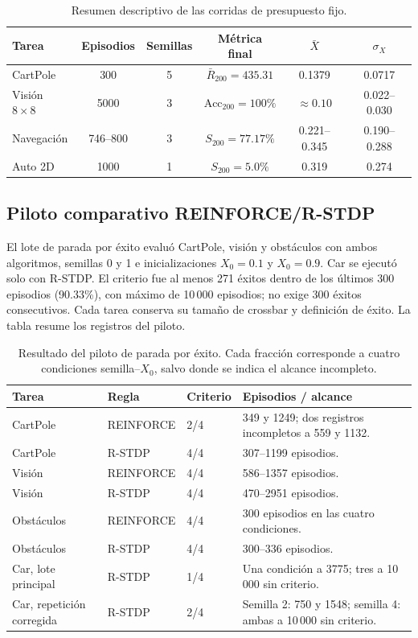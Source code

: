 \begin{table}[H]
\centering
\small
\caption{Resumen descriptivo de las corridas de presupuesto fijo.}
\label{tab:cross_task}
\begin{tabular}{lccccc}
\toprule
Tarea & Episodios & Semillas & M\'etrica final & $\bar X$ & $\sigma_X$\\
\midrule
CartPole & 300 & 5 & $\bar R_{200}=435.31$ & 0.1379 & 0.0717\\
Visi\'on $8\times8$ & 5000 & 3 & $\mathrm{Acc}_{200}=100\%$ & $\approx0.10$ & 0.022--0.030\\
Navegaci\'on & 746--800 & 3 & $S_{200}=77.17\%$ & 0.221--0.345 & 0.190--0.288\\
Auto 2D & 1000 & 1 & $S_{200}=5.0\%$ & 0.319 & 0.274\\
\bottomrule
\end{tabular}
\end{table}

\subsection{Piloto comparativo REINFORCE/R-STDP}
\label{sec:piloto_rstdp_reinforce}

El lote de parada por \'exito evalu\'o CartPole, visi\'on y obst\'aculos con ambos
algoritmos, semillas 0 y 1 e inicializaciones $X_0=0.1$ y $X_0=0.9$.
Car se ejecut\'o solo con R-STDP. El criterio fue al menos 271 \'exitos dentro
de los \'ultimos 300 episodios (90.33\%), con m\'aximo de 10\,000 episodios;
no exige 300 \'exitos consecutivos. Cada tarea conserva su tama\~no de crossbar
y definici\'on de \'exito. La tabla resume los registros del piloto.

\begin{table}[H]
\centering
\footnotesize
\begin{tabularx}{\textwidth}{l l p{1.5cm} X}
\toprule
Tarea & Regla & Criterio & Episodios / alcance\\
\midrule
CartPole & REINFORCE & 2/4 & 349 y 1249; dos registros incompletos a 559 y 1132.\\
CartPole & R-STDP & 4/4 & 307--1199 episodios.\\
Visi\'on & REINFORCE & 4/4 & 586--1357 episodios.\\
Visi\'on & R-STDP & 4/4 & 470--2951 episodios.\\
Obst\'aculos & REINFORCE & 4/4 & 300 episodios en las cuatro condiciones.\\
Obst\'aculos & R-STDP & 4/4 & 300--336 episodios.\\
Car, lote principal & R-STDP & 1/4 & Una condici\'on a 3775; tres a 10\,000 sin criterio.\\
Car, repetici\'on corregida & R-STDP & 2/4 & Semilla 2: 750 y 1548; semilla 4: ambas a 10\,000 sin criterio.\\
\bottomrule
\end{tabularx}
\caption{Resultado del piloto de parada por \'exito. Cada fracci\'on corresponde a cuatro condiciones semilla--$X_0$, salvo donde se indica el alcance incompleto.}
\label{tab:piloto_rstdp_reinforce}
\end{table}

